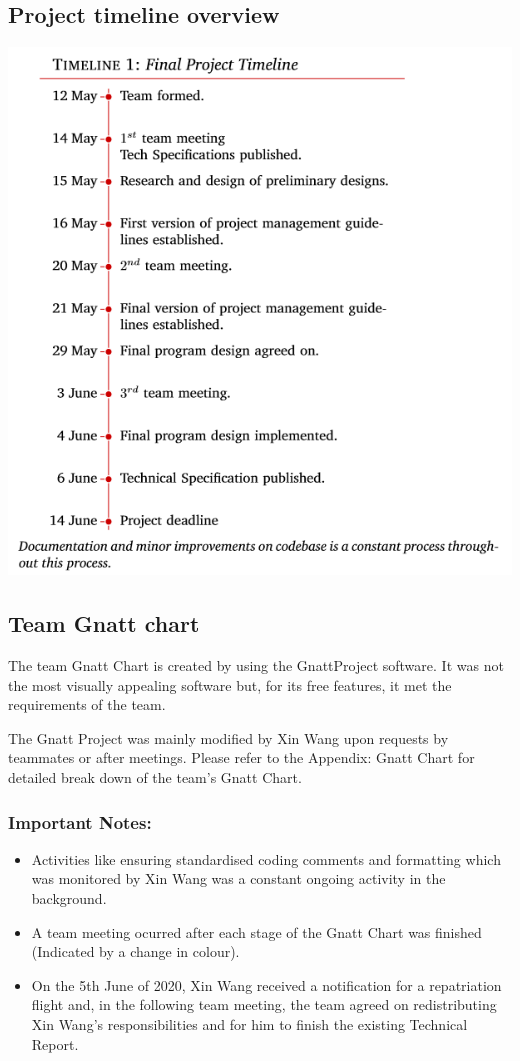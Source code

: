 \documentclass[12pt,a4paper]{article}
\begin{document}
	\subsection{Project timeline overview}
	\includegraphics{Timeline.PNG}
	\pagebreak

	\subsection{Team Gnatt chart}
	The team Gnatt Chart is created by using the GnattProject software. It was not the most 
	visually appealing software but, for its free features, it met the requirements of the team. \par
	The Gnatt Project was mainly modified by Xin Wang upon requests by teammates or after meetings. Please
	refer to the Appendix: Gnatt Chart for detailed break down of the team's Gnatt Chart. \par
	\subsubsection{Important Notes:}
	\begin{itemize}
		\item Activities like ensuring standardised coding comments and formatting which was monitored by 
		Xin Wang was a constant ongoing activity in the background. 
		\item A team meeting ocurred after each stage of the Gnatt Chart was finished (Indicated by 
		a change in colour).
		\item On the 5th June of 2020, Xin Wang received a notification for a repatriation flight
		and, in the following team meeting, the team agreed on redistributing Xin Wang's responsibilities
		and for him to finish the existing Technical Report.
	\end{itemize}
	
\end{document}
